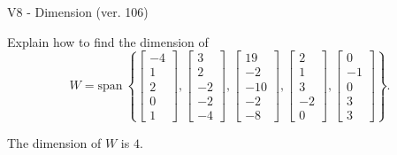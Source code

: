 \begin{exercise}
  \begin{exerciseTitle}V8 - Dimension (ver. 106)\end{exerciseTitle}
  \begin{exerciseStatement}
    Explain how to find the dimension of 
\[W=\mathrm{span}\ \left\{\left[\begin{array}{r}
-4 \\
1 \\
2 \\
0 \\
1
\end{array}\right] , \left[\begin{array}{r}
3 \\
2 \\
-2 \\
-2 \\
-4
\end{array}\right] , \left[\begin{array}{r}
19 \\
-2 \\
-10 \\
-2 \\
-8
\end{array}\right] , \left[\begin{array}{r}
2 \\
1 \\
3 \\
-2 \\
0
\end{array}\right] , \left[\begin{array}{r}
0 \\
-1 \\
0 \\
3 \\
3
\end{array}\right]\right\}.\]



  \end{exerciseStatement}
  \begin{exerciseAnswer}
   The dimension of \(W\) is  \(4\).
  


  \end{exerciseAnswer}
\end{exercise}